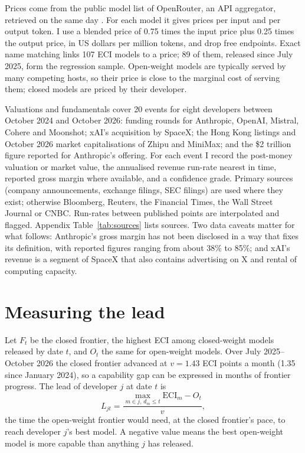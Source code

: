 \documentclass[12pt]{article}
\newcommand{\ECI}{\mathrm{ECI}}
\begin{document}
Prices come from the public model list of OpenRouter, an API aggregator, retrieved on the same day \citep{openrouter2026}. For each model it gives prices per input and per output token. I use a blended price of 0.75 times the input price plus 0.25 times the output price, in US dollars per million tokens, and drop free endpoints. Exact name matching links 107 ECI models to a price; 89 of them, released since July 2025, form the regression sample. Open-weight models are typically served by many competing hosts, so their price is close to the marginal cost of serving them; closed models are priced by their developer.

Valuations and fundamentals cover 20 events for eight developers between October 2024 and October 2026: funding rounds for Anthropic, OpenAI, Mistral, Cohere and Moonshot; xAI's acquisition by SpaceX; the Hong Kong listings and October 2026 market capitalisations of Zhipu and MiniMax; and the \$2 trillion figure reported for Anthropic's offering. For each event I record the post-money valuation or market value, the annualised revenue run-rate nearest in time, reported gross margin where available, and a confidence grade. Primary sources (company announcements, exchange filings, SEC filings) are used where they exist; otherwise Bloomberg, Reuters, the Financial Times, the Wall Street Journal or CNBC. Run-rates between published points are interpolated and flagged. Appendix Table~\ref{tab:sources} lists sources. Two data caveats matter for what follows: Anthropic's gross margin has not been disclosed in a way that fixes its definition, with reported figures ranging from about 38\% to 85\%; and xAI's revenue is a segment of SpaceX that also contains advertising on X and rental of computing capacity.

\section{Measuring the lead}\label{sec:lead}

Let $F_t$ be the closed frontier, the highest ECI among closed-weight models released by date $t$, and $O_t$ the same for open-weight models. Over July 2025--October 2026 the closed frontier advanced at $v = 1.43$ ECI points a month (1.35 since January 2024), so a capability gap can be expressed in months of frontier progress. The lead of developer $j$ at date $t$ is
\begin{equation}
L_{jt} = \frac{\max_{m \in j,\, d_m \le t} \ECI_m - O_t}{v},
\label{eq:lead}
\end{equation}
the time the open-weight frontier would need, at the closed frontier's pace, to reach developer $j$'s best model. A negative value means the best open-weight model is more capable than anything $j$ has released.
\end{document}
